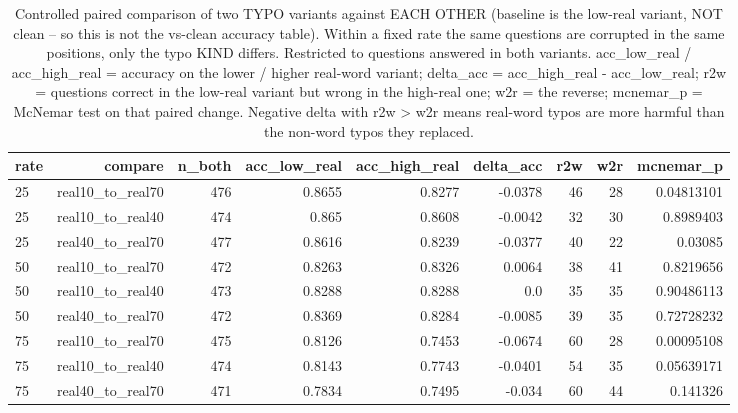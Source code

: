 \documentclass[11pt]{article}
\begin{document}
\begin{table}[H]
\centering
\caption{Controlled paired comparison of two TYPO variants against EACH OTHER (baseline is the low-real variant, NOT clean -- so this is not the vs-clean accuracy table). Within a fixed rate the same questions are corrupted in the same positions, only the typo KIND differs. Restricted to questions answered in both variants. acc\_low\_real / acc\_high\_real = accuracy on the lower / higher real-word variant; delta\_acc = acc\_high\_real - acc\_low\_real; r2w = questions correct in the low-real variant but wrong in the high-real one; w2r = the reverse; mcnemar\_p = McNemar test on that paired change. Negative delta with r2w > w2r means real-word typos are more harmful than the non-word typos they replaced.}
\small
\begin{adjustbox}{max width=\textwidth}
\begin{tabular}{lrrrrrrrr}
\toprule
\textbf{rate} & \textbf{compare} & \textbf{n\_both} & \textbf{acc\_low\_real} & \textbf{acc\_high\_real} & \textbf{delta\_acc} & \textbf{r2w} & \textbf{w2r} & \textbf{mcnemar\_p} \\
\midrule
25 & real10\_to\_real70 & 476 & 0.8655 & 0.8277 & -0.0378 & 46 & 28 & 0.04813101 \\
25 & real10\_to\_real40 & 474 & 0.865 & 0.8608 & -0.0042 & 32 & 30 & 0.8989403 \\
25 & real40\_to\_real70 & 477 & 0.8616 & 0.8239 & -0.0377 & 40 & 22 & 0.03085 \\
50 & real10\_to\_real70 & 472 & 0.8263 & 0.8326 & 0.0064 & 38 & 41 & 0.8219656 \\
50 & real10\_to\_real40 & 473 & 0.8288 & 0.8288 & 0.0 & 35 & 35 & 0.90486113 \\
50 & real40\_to\_real70 & 472 & 0.8369 & 0.8284 & -0.0085 & 39 & 35 & 0.72728232 \\
75 & real10\_to\_real70 & 475 & 0.8126 & 0.7453 & -0.0674 & 60 & 28 & 0.00095108 \\
75 & real10\_to\_real40 & 474 & 0.8143 & 0.7743 & -0.0401 & 54 & 35 & 0.05639171 \\
75 & real40\_to\_real70 & 471 & 0.7834 & 0.7495 & -0.034 & 60 & 44 & 0.141326 \\
\bottomrule
\end{tabular}
\end{adjustbox}
\end{table}
\end{document}
